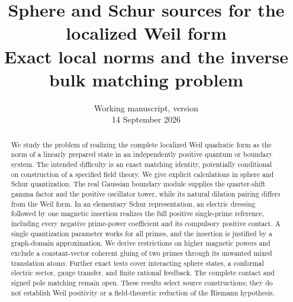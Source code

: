 \documentclass[11pt]{article}
\title{Sphere and Schur sources for the localized Weil form\\[5pt]
\large Exact local norms and the inverse bulk matching problem}
\author{}
\date{Working manuscript, version \draftversion\\14 September 2026}
\numberwithin{equation}{section}
\theoremstyle{definition}
\theoremstyle{remark}
\begin{document}
\maketitle
\begin{abstract}
We study the problem of realizing the complete localized Weil quadratic
form as the norm of a linearly prepared state in an independently positive
quantum or boundary system. The intended difficulty is an exact matching
identity, potentially conditional on construction of a specified field
theory. We give explicit calculations in sphere and Schur quantization.
The real Gaussian boundary module supplies the quarter-shift gamma factor
and the positive oscillator tower, while its natural dilation pairing
differs from the Weil form. In an elementary Schur representation, an
electric dressing followed by one magnetic insertion realizes the full
positive single-prime reference, including every negative prime-power
coefficient and its compulsory positive contact. A single quantization
parameter works for all primes, and the insertion is justified by a
graph-domain approximation. We derive restrictions on higher magnetic
powers and exclude a constant-vector coherent gluing of two primes through
its unwanted mixed translation atoms. Further exact tests cover interacting
sphere states, a conformal electric sector, gauge transfer, and finite
rational feedback. The complete contact and signed pole matching remain
open. These results select source constructions; they do not establish
Weil positivity or a field-theoretic reduction of the Riemann hypothesis.
\end{abstract}

\clearpage
{\small\tableofcontents}
\clearpage







\appendix




\clearpage
{}
{}

\end{document}
